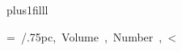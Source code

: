 \kern1pc
\vskip 0pt plus1filll

\setbox\TestBox=\hbox{%
         {\boxit 1.5pc/.75pc, \volfont Volume \volno,
          Number \issno, \issdt \PostIssno<}
}
%
\ifdim\wd\TestBox < .8\pagewd
  \unhbox\TestBox
\else
  \boxit 3pc/.75pc,
    \vbox{\volfont \baselineskip=18pt
          \let\Dash=\cr
          \halign{#\hfil\cr
                  Volume \volno, Number \issno, \issdt \PostIssno \cr}}<
\fi
\bye
